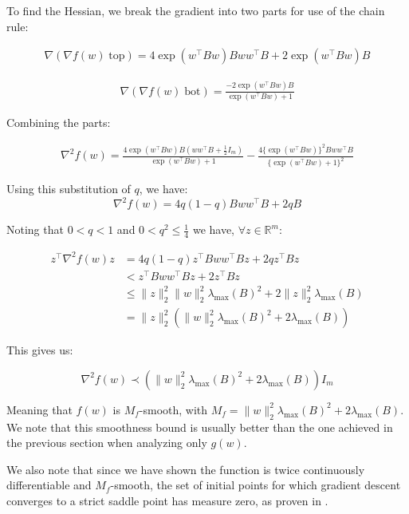 \documentclass[11pt]{article}
\begin{document}
To find the Hessian, we break the gradient into two parts for use of the chain rule:

\begin{align*}
    \nabla (\nabla f(w) \; \textrm{top}) = 4 \exp(w^{\top}Bw)Bww^{\top}B  + 2 \exp(w^{\top}Bw)B
\end{align*}

\begin{align*}
    \nabla (\nabla f(w) \; \textrm{bot}) = \frac{-2 \exp(w^{\top}Bw)B}{\exp(w^{\top}Bw) + 1}
\end{align*}

Combining the parts:

\begin{align*}
    \nabla^2 f(w) = \frac{4 \exp(w^{\top}Bw)B(ww^{\top}B + \frac{1}{2}I_m)}{\exp(w^{\top}Bw) + 1} - \frac{4 \{\exp(w^{\top}Bw)\}^2 Bww^{\top}B }{\{\exp(w^{\top}Bw) + 1\}^2}
\end{align*}

Using this substitution of $q$,  we have:
\begin{equation}
    \nabla^2 f(w) = 4q(1-q)Bww^{\top}B + 2qB
\end{equation}

Noting that $0 < q < 1$ and $0 < q^2 \leq \frac{1}{4}$ we have, $\forall z \in \mathbb{R}^m$:

\begin{align*}
z^{\top} \nabla^2 f(w) z 
&= 4q(1-q) z^{\top} Bww^{\top}B z + 2q z^{\top} B z \\
&< z^{\top} Bww^{\top}B z + 2 z^{\top} B z \\
&\leq \|z\|_2^2 \|w\|_2^2 \lambda_{\max} (B)^2 + 2 \|z\|_2^2 \lambda_{\max} (B) \\
&= \|z\|_2^2 ( \|w\|_2^2 \lambda_{\max} (B)^2 + 2 \lambda_{\max} (B) ) 
\end{align*}

This gives us:

\begin{equation}
    \nabla^2 f(w) \prec ( \|w\|_2^2 \lambda_{\max} (B)^2 + 2 \lambda_{\max} (B)) I_m
\end{equation}

Meaning that $f(w)$ is $M_f$-smooth, with $M_f = \|w\|_2^2 \lambda_{\max} (B)^2 + 2 \lambda_{\max} (B)$. We note that this smoothness bound is usually better than the one achieved in the previous section when analyzing only $g(w)$.

We also note that since we have shown the function is twice continuously differentiable and $M_f$-smooth, the set of initial points for which gradient descent converges to a strict saddle point has measure zero, as proven in \cite{lee_gradient_2016}.
\end{document}
